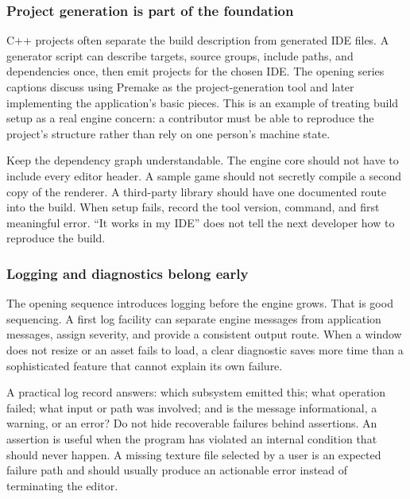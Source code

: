 \subsubsection{Project generation is part of the foundation}\label{05-engine-i-ch013-project-generation-is-part-of-the-foundation}

C++ projects often separate the build description from generated IDE files. A generator script can describe targets, source groups, include paths, and dependencies once, then emit projects for the chosen IDE. The opening series captions discuss using Premake as the project-generation tool and later implementing the application's basic pieces. This is an example of treating build setup as a real engine concern: a contributor must be able to reproduce the project's structure rather than rely on one person's machine state.

Keep the dependency graph understandable. The engine core should not have to include every editor header. A sample game should not secretly compile a second copy of the renderer. A third-party library should have one documented route into the build. When setup fails, record the tool version, command, and first meaningful error. ``It works in my IDE'' does not tell the next developer how to reproduce the build.

\subsubsection{Logging and diagnostics belong early}\label{05-engine-i-ch013-logging-and-diagnostics-belong-early}

The opening sequence introduces logging before the engine grows. That is good sequencing. A first log facility can separate engine messages from application messages, assign severity, and provide a consistent output route. When a window does not resize or an asset fails to load, a clear diagnostic saves more time than a sophisticated feature that cannot explain its own failure.

A practical log record answers: which subsystem emitted this; what operation failed; what input or path was involved; and is the message informational, a warning, or an error? Do not hide recoverable failures behind assertions. An assertion is useful when the program has violated an internal condition that should never happen. A missing texture file selected by a user is an expected failure path and should usually produce an actionable error instead of terminating the editor.

